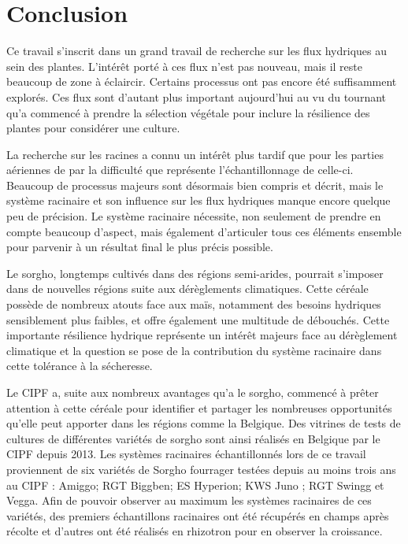 \section{Conclusion}

Ce travail s'inscrit dans un grand travail de recherche sur les flux hydriques au sein des plantes.
L'intérêt porté à ces flux n'est pas nouveau, mais il reste beaucoup de zone à éclaircir.
Certains processus ont pas encore été suffisamment explorés.
Ces flux sont d'autant plus important aujourd'hui au vu du tournant qu'a commencé à prendre la sélection végétale pour inclure la résilience des plantes pour considérer une culture.
\newline

La recherche sur les racines a connu un intérêt plus tardif que pour les parties aériennes de par la difficulté que représente l'échantillonnage de celle-ci.
Beaucoup de processus majeurs sont désormais bien compris et décrit, mais le système racinaire et son influence sur les flux hydriques manque encore quelque peu de précision.
Le système racinaire nécessite, non seulement de prendre en compte beaucoup d'aspect, mais également d'articuler tous ces éléments ensemble pour parvenir à un résultat final le plus précis possible.
\newline

Le sorgho, longtemps cultivés dans des régions semi-arides, pourrait s'imposer dans de nouvelles régions suite aux dérèglements climatiques.
Cette céréale possède de nombreux atouts face aux maïs, notamment des besoins hydriques sensiblement plus faibles, et offre également une multitude de débouchés.
Cette importante résilience hydrique représente un intérêt majeurs face au dérèglement climatique et la question se pose de la contribution du système racinaire dans cette tolérance à la sécheresse.
\newline

Le CIPF a, suite aux nombreux avantages qu'a le sorgho, commencé à prêter attention à cette céréale pour identifier et partager les nombreuses opportunités qu'elle peut apporter dans les régions comme la Belgique.
Des vitrines de tests de cultures de différentes variétés de sorgho sont ainsi réalisés en Belgique par le CIPF depuis 2013.
Les systèmes racinaires échantillonnés lors de ce travail proviennent de six variétés de Sorgho fourrager testées depuis au moins trois ans au CIPF : Amiggo; RGT Biggben; ES Hyperion; KWS Juno ; RGT Swingg et Vegga.
Afin de pouvoir observer au maximum les systèmes racinaires de ces variétés, des premiers échantillons racinaires ont été récupérés en champs après récolte et d'autres ont été réalisés en rhizotron pour en observer la croissance.
\newline

